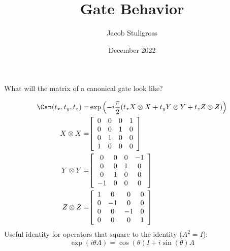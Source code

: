\documentclass{article}
\title{Gate Behavior}
\author{Jacob Stuligross}
\date{December 2022}
\begin{document}
\maketitle

What will the matrix of a canonical gate look like?

\begin{align*}
  \Can(t_x,t_y,t_z) =& \exp\pqty{-i\frac{\pi}{2}\pqty{t_x X\otimes X + t_y Y\otimes Y + t_z Z\otimes Z}} \\
  X \otimes X =&
  \bqty{
  \begin{array}{cccc}
    0&0&0&1 \\
    0&0&1&0 \\
    0&1&0&0 \\
    1&0&0&0 \\
  \end{array}
  } \\
  Y \otimes Y =&
  \bqty{
  \begin{array}{cccc}
    0&0&0&-1 \\
    0&0&1&0 \\
    0&1&0&0 \\
    -1&0&0&0 \\
  \end{array}
  } \\
  Z \otimes Z =&
  \bqty{
  \begin{array}{cccc}
    1&0&0&0 \\
    0&-1&0&0 \\
    0&0&-1&0 \\
    0&0&0&1 \\
  \end{array}
  } \\
\end{align*}
Useful identity for operators that square to the identity ($A^2 = I$):
$$
\exp(i\theta A) = \cos(\theta) I + i\sin(\theta) A
$$
\end{document}
